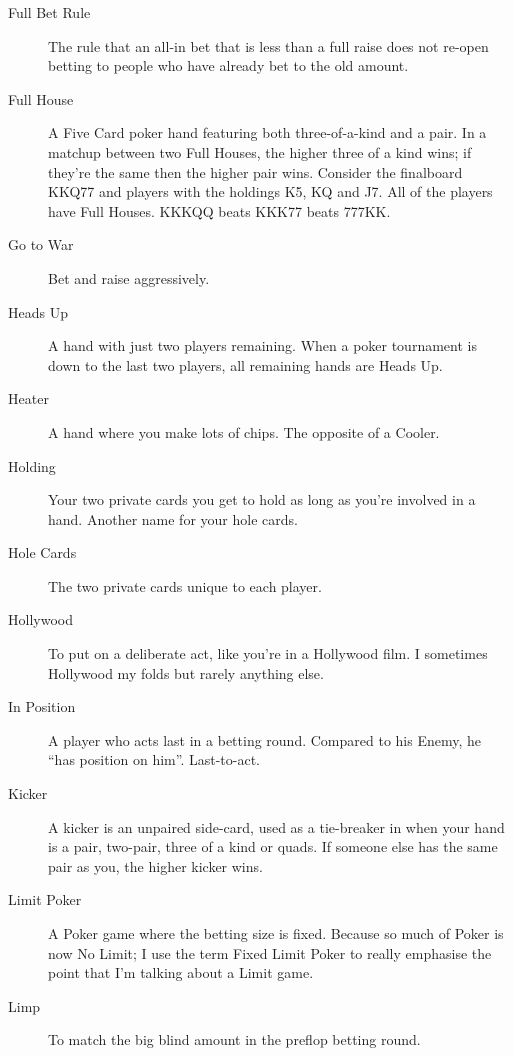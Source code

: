 \begin{description}
\item[Full Bet Rule] The rule that an all-in bet that is less than a
full raise does not re-open betting to people who have already bet to
the old amount.

\item[Full House] A Five Card poker hand featuring both
three-of-a-kind and a pair. In a matchup between two Full Houses, the
higher three of a kind wins; if they're the same then the higher pair
wins. Consider the finalboard KKQ77 and players with the holdings K5,
KQ and J7. All of the players have Full Houses. KKKQQ beats KKK77
beats 777KK.

\item[Go to War] Bet and raise aggressively.

\item[Heads Up] A hand with just two players remaining. When a poker
tournament is down to the last two players, all remaining hands are
Heads Up.

\item[Heater] A hand where you make lots of chips. The opposite of a
Cooler.

\item[Holding] Your two private cards you get to hold as long as
you're involved in a hand. Another name for your hole cards.

\item[Hole Cards] The two private cards unique to each player.

\item[Hollywood] To put on a deliberate act, like you're in a
Hollywood film. I sometimes Hollywood my folds but rarely anything
else.

\item[In Position] A player who acts last in a betting round. Compared
to his Enemy, he ``has position on him''. Last-to-act.

\item[Kicker] A kicker is an unpaired side-card, used as a tie-breaker
in when your hand is a pair, two-pair, three of a kind or quads. If
someone else has the same pair as you, the higher kicker wins.

\item[Limit Poker] A Poker game where the betting size is
fixed. Because so much of Poker is now No Limit; I use the term
Fixed Limit Poker to really emphasise the point that I'm talking about
a Limit game.

\item[Limp] To match the big blind amount in the preflop betting
round.


\end{description}
